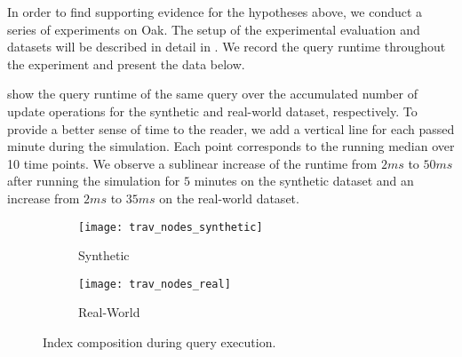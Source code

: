 \documentclass[abstracton,12pt]{scrartcl}
\theoremstyle{definition}
\begin{document}


In order to find supporting evidence for the hypotheses above, we conduct a series of
experiments on Oak. The setup of the  experimental evaluation and
datasets will be described in detail in . We
record the query runtime throughout the experiment and present the data below.

 show the 
query runtime of the same query over the accumulated number of update operations for
the synthetic and real-world dataset, respectively. To provide a better sense
of time to the reader, we add a vertical line for each passed minute during the simulation.
Each point corresponds to the running median \cite{running-median} over 10 time points.
We observe a sublinear increase of the runtime from $2 ms$ to $50 ms$
after running the simulation for $5$ minutes
on the synthetic dataset and an increase from $2 ms$ to $35 ms$ on the
real-world dataset. 

\begin{figure}[!ht]
  \centering
  \begin{subfigure}{0.49\linewidth}
    \centering
    \caption{Synthetic}
    \texttt{[image: trav\_nodes\_synthetic]}
    \label{fig:trav_nodes_synthetic}
  \end{subfigure}
  \begin{subfigure}{0.49\linewidth}
    \centering
    \caption{Real-World}
    \texttt{[image: trav\_nodes\_real]}
    \label{fig:trav_nodes_real}
  \end{subfigure}
  \vspace{-0.65cm}
  \caption[Index composition during query execution]{Index composition during query execution.}
  \label{fig:trav_nodes}
\end{figure}
\end{document}
